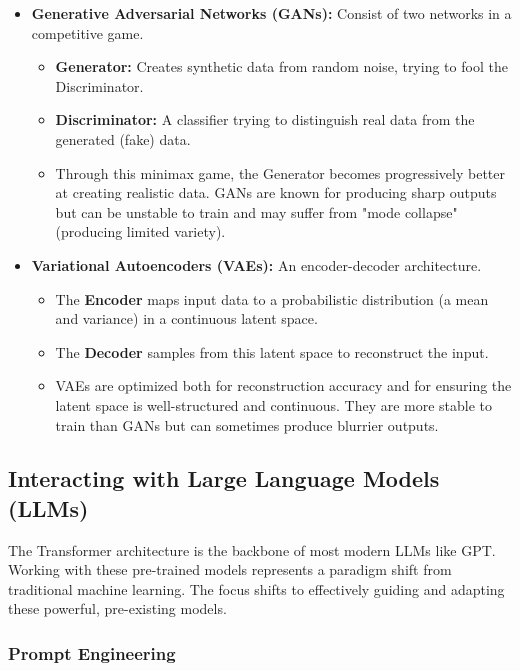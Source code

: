 \documentclass[11pt,a4paper]{article}
\begin{document}
\begin{itemize}
    \item \textbf{Generative Adversarial Networks (GANs):} Consist of two networks in a competitive game.
    \begin{itemize}
        \item \textbf{Generator:} Creates synthetic data from random noise, trying to fool the Discriminator.
        \item \textbf{Discriminator:} A classifier trying to distinguish real data from the generated (fake) data.
        \item Through this minimax game, the Generator becomes progressively better at creating realistic data. GANs are known for producing sharp outputs but can be unstable to train and may suffer from "mode collapse" (producing limited variety).
    \end{itemize}
    \item \textbf{Variational Autoencoders (VAEs):} An encoder-decoder architecture.
    \begin{itemize}
        \item The \textbf{Encoder} maps input data to a probabilistic distribution (a mean and variance) in a continuous latent space.
        \item The \textbf{Decoder} samples from this latent space to reconstruct the input.
        \item VAEs are optimized both for reconstruction accuracy and for ensuring the latent space is well-structured and continuous. They are more stable to train than GANs but can sometimes produce blurrier outputs.
    \end{itemize}
\end{itemize}

\subsection{Interacting with Large Language Models (LLMs)}

The Transformer architecture is the backbone of most modern LLMs like GPT. Working with these pre-trained models represents a paradigm shift from traditional machine learning. The focus shifts to effectively guiding and adapting these powerful, pre-existing models.

\subsubsection{Prompt Engineering}
\end{document}
